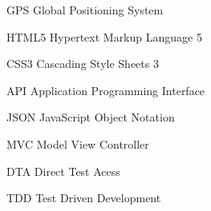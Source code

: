 \begin{siglas}
  \item[GPS] Global Positioning System
  \item[HTML5] Hypertext Markup Language 5
  \item[CSS3] Cascading Style Sheets 3
  \item[API] Application Programming Interface
  \item[JSON] JavaScript Object Notation
  \item[MVC] Model View Controller
  \item[DTA] Direct Test Acess
  \item[TDD] Test Driven Development
\end{siglas}
